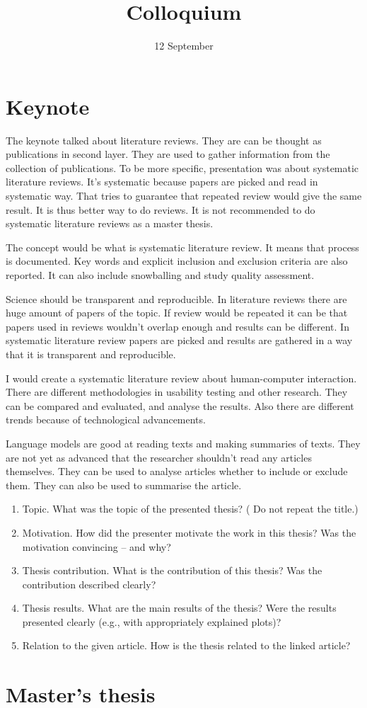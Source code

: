 \documentclass[a4paper]{article}
\title{Colloquium}
\date{12 September}
\author{}
\begin{document}
\maketitle

\section*{Keynote}

The keynote talked about literature reviews. They are can be thought
as publications in second layer. They are used to gather information
from the collection of publications. To be more specific,
presentation was about systematic literature reviews. It's systematic
because papers are picked and read in systematic way. That tries to
guarantee that repeated review would give the same result. It is
thus better way to do reviews. It is not recommended to do
systematic literature reviews as a master thesis.

The concept would be what is systematic literature review. It means
that process is documented. Key words and explicit inclusion and
exclusion criteria are also reported. It can also include snowballing
and study quality assessment.

Science should be transparent and reproducible. In literature reviews
there are huge amount of papers of the topic. If review would be
repeated it can be that papers used in reviews wouldn't overlap
enough and results can be different. In systematic literature review
papers are picked and results are gathered in a way that it is
transparent and reproducible.

I would create a systematic literature review about human-computer
interaction. There are different methodologies in usability testing
and other research. They can be compared and evaluated, and analyse
the results. Also there are different trends because of technological
advancements.

Language models are good at reading texts and making summaries of
texts. They are not yet as advanced that the researcher shouldn't
read any articles themselves. They can be used to analyse articles
whether to include or exclude them. They can also be used to
summarise the article.

\begin{enumerate}
  \item Topic. What was the topic of the presented thesis? ( Do not
    repeat the title.)

  \item Motivation. How did the presenter motivate the work in this
    thesis? Was the motivation convincing -- and why?

  \item Thesis contribution. What is the contribution of this thesis?
    Was the contribution described clearly?

  \item Thesis results. What are the main results of the thesis? Were
    the results presented clearly (e.g., with appropriately explained
    plots)?

  \item Relation to the given article. How is the thesis related to
    the linked article?
\end{enumerate}


\section*{Master's thesis}
\end{document}
